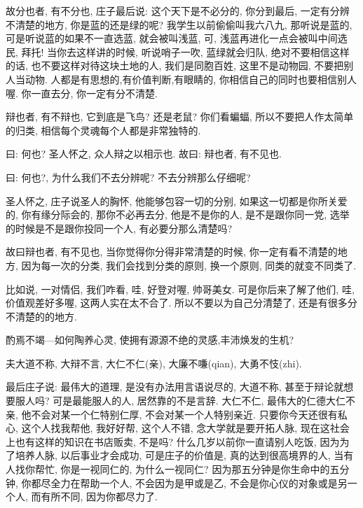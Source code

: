 \documentclass[11pt]{article}
\begin{document}
{\color{blue} 故分也者, 有不分也}, 庄子最后说: 这个天下是不必分的, 你分到最后, 一定有分辨不清楚的地方, 你是蓝的还是绿的呢? 我学生以前偷偷叫我六八九, 那听说是蓝的, 可是听说蓝的如果不一直选蓝, 就会被叫浅蓝, 可, 浅蓝再进化一点会被叫中间选民, 拜托! 当你去这样讲的时候, 听说哨子一吹, 蓝绿就会归队, 绝对不要相信这样的话, 也不要这样对待这块土地的人, 我们是同胞百姓, 这里不是动物园, 不要把别人当动物. 人都是有思想的,有价值判断,有眼睛的, 你相信自己的同时也要相信别人喔. 你一直去分, 你一定有分不清楚.

{\color{blue} 辩也者, 有不辩也}, 它到底是飞鸟? 还是老鼠? 你们看蝙蝠, 所以不要把人作太简单的归类, 相信每个灵魂每个人都是非常独特的.

\begin{center}
	{\color{magenta} 曰: 何也? 圣人怀之, 众人辩之以相示也. 故曰: 辩也者, 有不见也.}
\end{center}

\vspace{-0.5cm}

{\color{blue} 曰: 何也?}, 为什么我们不去分辨呢? 不去分辨那么仔细呢? 

{\color{blue} 圣人怀之}, 庄子说圣人的胸怀, 他能够包容一切的分别, 如果这一切都是你所关爱的, 你有缘分际会的, 那你不必再去分, 他是不是你的人, 是不是跟你同一党, 选举的时候是不是跟你投同一个人, 有必要分那么清楚吗?

{\color{blue} 故曰辩也者, 有不见也}, 当你觉得你分得非常清楚的时候, 你一定有看不清楚的地方, 因为每一次的分类, 我们会找到分类的原则, 换一个原则, 同类的就变不同类了. 

比如说, 一对情侣, 我们咋看, 哇, 好登对喔, 帅哥美女. 可是你后来了解了他们, 哇, 价值观差好多喔, 这两人实在太不合了. 所以不要以为自己分清楚了, 还是有很多分不清楚的的地方.

{\Large {\color{purple} 酌焉不竭---如何陶养心灵, 使拥有源源不绝的灵感,丰沛焕发的生机?}}

\vspace{-0.5cm}

\begin{center}
	{\color{magenta} 夫大道不称, 大辩不言, 大仁不仁(亲), 大廉不嗛(qian), 大勇不忮(zhi).}
\end{center}

\vspace{-0.5cm}

最后庄子说: 最伟大的道理, 是没有办法用言语说尽的, {\color{blue} 大道不称}, 甚至于辩论就想要服人吗? 可是最能服人的人, 居然靠的不是言辞. {\color{blue} 大仁不仁}, 最伟大的仁德大仁不亲, 他不会对某一个仁特别仁厚, 不会对某一个人特别亲近. 只要你今天还很有私心, 这个人找我帮他, 我好好帮, 这个人不错, 念大学就是要开拓人脉, 现在这社会上也有这样的知识在书店贩卖, 不是吗? 什么几岁以前你一直请别人吃饭, 因为为了培养人脉, 以后事业才会成功, 可是庄子的价值是, 真的达到很高境界的人, 当有人找你帮忙, 你是一视同仁的, 为什么一视同仁?  因为那五分钟是你生命中的五分钟, 你都尽全力在帮助一个人, 不会因为是甲或是乙, 不会是你心仪的对象或是另一个人, 而有所不同, 因为你都尽力了.
\end{document}
